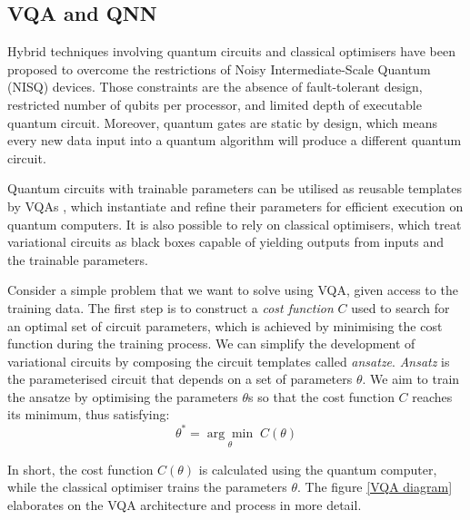 \subsection{VQA and QNN}

Hybrid techniques involving quantum circuits and classical optimisers have been proposed to overcome the restrictions of Noisy Intermediate-Scale Quantum (NISQ) \cite{brooksQuantumSupremacyHunt2019} devices. 
Those constraints are the absence of fault-tolerant design, restricted number of qubits per processor, and limited depth of executable quantum circuit. 
Moreover, quantum gates are static by design, which means every new data input into a quantum algorithm will produce a different quantum circuit.

Quantum circuits with trainable parameters can be utilised as reusable templates by VQAs \cite{cerezo2021variational}, which instantiate and refine their parameters for efficient execution on quantum computers.
It is also possible to rely on classical optimisers, which treat variational circuits as black boxes capable of yielding outputs from inputs and the trainable parameters.

Consider a simple problem that we want to solve using VQA, given access to the training data.
The first step is to construct a \textit{cost function} $C$ used to search for an optimal set of circuit parameters, which is achieved by minimising the cost function during the training process.
We can simplify the development of variational circuits by composing the circuit templates called \textit{ansatze}. 
\textit{Ansatz} is the parameterised circuit that depends on a set of parameters $\theta$. We aim to train the ansatze by optimising the parameters $\theta$s so that the cost function $C$ reaches its minimum, thus satisfying:
\begin{equation}
    \theta^* = \underset{\theta}{\arg \min} \;C(\theta)
    \label{optimize theta with ansatz}
\end{equation}

In short, the cost function $C(\theta)$ is calculated using the quantum computer, while the classical optimiser trains the parameters $\theta$. The figure \ref{VQA diagram} elaborates on the VQA architecture and process in more detail.

